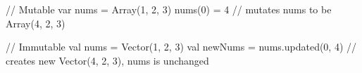 // Mutable
var nums = Array(1, 2, 3)
nums(0) = 4 // mutates nums to be Array(4, 2, 3)

// Immutable 
val nums = Vector(1, 2, 3)
val newNums = nums.updated(0, 4) // creates new Vector(4, 2, 3), nums is unchanged